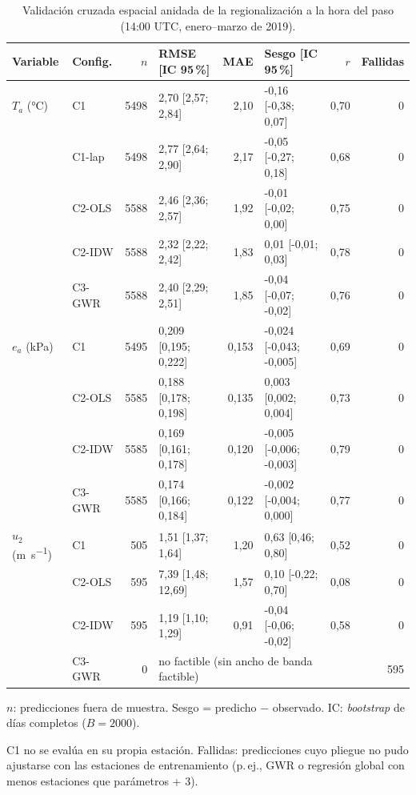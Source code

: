 \begin{table}[htbp]
\centering
\footnotesize
\caption{Validación cruzada espacial anidada de la regionalización a la hora del paso (14:00 UTC, enero--marzo de 2019).}\label{tab:cv}
\begin{threeparttable}
\begin{tabular}{llrlrlrr}
\toprule
Variable & Config. & $n$ & RMSE [IC 95\,\%] & MAE & Sesgo [IC 95\,\%] & $r$ & Fallidas \\
\midrule
$T_a$ (\si{\celsius}) & C1 & 5498 & 2,70 [2,57; 2,84] & 2,10 & -0,16 [-0,38; 0,07] & 0,70 & 0 \\
 & C1-lap & 5498 & 2,77 [2,64; 2,90] & 2,17 & -0,05 [-0,27; 0,18] & 0,68 & 0 \\
 & C2-OLS & 5588 & 2,46 [2,36; 2,57] & 1,92 & -0,01 [-0,02; 0,00] & 0,75 & 0 \\
 & C2-IDW & 5588 & 2,32 [2,22; 2,42] & 1,83 & 0,01 [-0,01; 0,03] & 0,78 & 0 \\
 & C3-GWR & 5588 & 2,40 [2,29; 2,51] & 1,85 & -0,04 [-0,07; -0,02] & 0,76 & 0 \\
$e_a$ (\si{\kilo\pascal}) & C1 & 5495 & 0,209 [0,195; 0,222] & 0,153 & -0,024 [-0,043; -0,005] & 0,69 & 0 \\
 & C2-OLS & 5585 & 0,188 [0,178; 0,198] & 0,135 & 0,003 [0,002; 0,004] & 0,73 & 0 \\
 & C2-IDW & 5585 & 0,169 [0,161; 0,178] & 0,120 & -0,005 [-0,006; -0,003] & 0,79 & 0 \\
 & C3-GWR & 5585 & 0,174 [0,166; 0,184] & 0,122 & -0,002 [-0,004; 0,000] & 0,77 & 0 \\
$u_2$ (\si{\metre\per\second}) & C1 & 505 & 1,51 [1,37; 1,64] & 1,20 & 0,63 [0,46; 0,80] & 0,52 & 0 \\
 & C2-OLS & 595 & 7,39 [1,48; 12,69] & 1,57 & 0,10 [-0,22; 0,70] & 0,08 & 0 \\
 & C2-IDW & 595 & 1,19 [1,10; 1,29] & 0,91 & -0,04 [-0,06; -0,02] & 0,58 & 0 \\
 & C3-GWR & 0 & \multicolumn{4}{l}{no factible (sin ancho de banda factible)} & 595 \\
\bottomrule
\end{tabular}
\begin{tablenotes}\footnotesize
\item $n$: predicciones fuera de muestra. Sesgo = predicho $-$ observado. IC: \emph{bootstrap} de días completos ($B = 2000$).
\item C1 no se evalúa en su propia estación. Fallidas: predicciones cuyo pliegue no pudo ajustarse con las estaciones de entrenamiento (p.\,ej., GWR o regresión global con menos estaciones que parámetros + 3).
\end{tablenotes}
\end{threeparttable}
\end{table}
